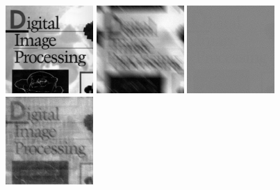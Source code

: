 \documentclass{article}
\begin{document}
\includegraphics[width=0.25\textwidth]{../data/book_cover.jpg}
\includegraphics[width=0.25\textwidth]{../data/blur_150_book_cover.jpg}
\includegraphics[width=0.25\textwidth]{../data/inverse_150_book_cover.jpg}
\includegraphics[width=0.25\textwidth]{../data/wiener_deconvolution_150_book_cover.jpg}
\end{document}
